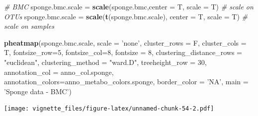 \documentclass[]{book}
\newenvironment{Shaded}{\begin{snugshade}}{\end{snugshade}}
\newcommand{\KeywordTok}[1]{\textcolor[rgb]{0.13,0.29,0.53}{\textbf{#1}}}
\newcommand{\DataTypeTok}[1]{\textcolor[rgb]{0.13,0.29,0.53}{#1}}
\newcommand{\DecValTok}[1]{\textcolor[rgb]{0.00,0.00,0.81}{#1}}
\newcommand{\StringTok}[1]{\textcolor[rgb]{0.31,0.60,0.02}{#1}}
\newcommand{\CommentTok}[1]{\textcolor[rgb]{0.56,0.35,0.01}{\textit{#1}}}
\newcommand{\NormalTok}[1]{#1}
\begin{document}
\begin{Shaded}
\begin{Highlighting}[]
\CommentTok{# BMC }
\NormalTok{sponge.bmc.scale =}\StringTok{ }\KeywordTok{scale}\NormalTok{(sponge.bmc,}\DataTypeTok{center =}\NormalTok{ T, }\DataTypeTok{scale =}\NormalTok{ T) }\CommentTok{# scale on OTUs}
\NormalTok{sponge.bmc.scale =}\StringTok{ }\KeywordTok{scale}\NormalTok{(}\KeywordTok{t}\NormalTok{(sponge.bmc.scale), }\DataTypeTok{center =}\NormalTok{ T, }\DataTypeTok{scale =}\NormalTok{ T) }\CommentTok{# scale on samples}

\KeywordTok{pheatmap}\NormalTok{(sponge.bmc.scale, }
         \DataTypeTok{scale =} \StringTok{'none'}\NormalTok{, }
         \DataTypeTok{cluster_rows =}\NormalTok{ F, }
         \DataTypeTok{cluster_cols =}\NormalTok{ T, }
         \DataTypeTok{fontsize_row=}\DecValTok{5}\NormalTok{, }\DataTypeTok{fontsize_col=}\DecValTok{8}\NormalTok{,}
         \DataTypeTok{fontsize =} \DecValTok{8}\NormalTok{,}
         \DataTypeTok{clustering_distance_rows =} \StringTok{"euclidean"}\NormalTok{,}
         \DataTypeTok{clustering_method =} \StringTok{"ward.D"}\NormalTok{,}
         \DataTypeTok{treeheight_row =} \DecValTok{30}\NormalTok{,}
         \DataTypeTok{annotation_col =}\NormalTok{ anno_col.sponge,}
         \DataTypeTok{annotation_colors=}\NormalTok{anno_metabo_colors.sponge,}
         \DataTypeTok{border_color =} \StringTok{'NA'}\NormalTok{,}
         \DataTypeTok{main =} \StringTok{'Sponge data - BMC'}\NormalTok{)}
\end{Highlighting}
\end{Shaded}

\texttt{[image: vignette\_files/figure-latex/unnamed-chunk-54-2.pdf]}
\end{document}
